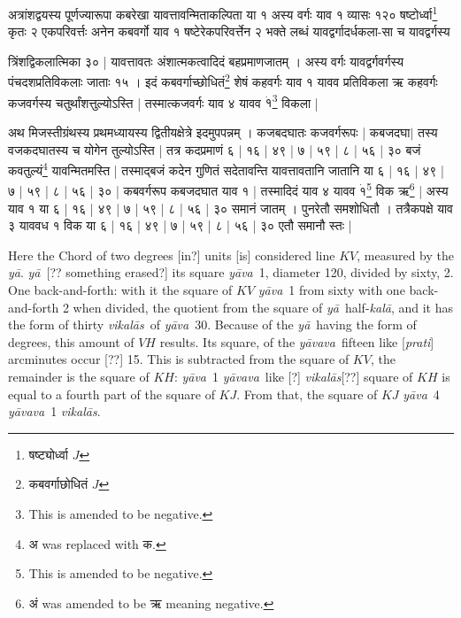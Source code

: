 \documentclass[12pt]{book}
\def\kala{\textit{ka\-l\=a}}
\def\ya{\textit{y\=a}}
\def\yava{\textit{y\=ava}}
\def\yavava{\textit{y\=avava}}
\def\vikalas{\textit{vi\-ka\-l\=as}}
\begin{document}
\newpage

{\s अत्रांशद्वयस्य पूर्णज्यारूपा कबरेखा
यावत्तावन्मिताकल्पिता या १ अस्य वर्गः
याव १ व्यासः १२० षष्टोर्ध्वा\footnote{{\s षष्ट्योर्ध्वा} $J$} कृतः २ एकपरिवर्त्तः अनेन कबवर्गो याव १ षष्टेरेकपरिवर्त्तेन २ भक्ते लब्धं
यावद्वर्गादर्धकला-सा च यावद्वर्गस्य 

त्रिंशद्विकलात्मिका ३० | 
यावत्तावतः अंशात्मकत्वादिदं बहप्रमाणजातम् । अस्य वर्गः यावद्वर्गवर्गस्य
पंचदशप्रतिविकलाः जाताः १५ । इदं कबवर्गाच्छोधितं\footnote{{\s कबवर्गाछोधितं} $J$} शेषं कहवर्गः याव १ यावव प्रतिविकला ऋ कहवर्गः कजवर्गस्य चतुर्थांशत्तुल्योऽस्ति |  तस्मात्कजवर्गः याव ४ यावव $\dot{१}$\footnote{This is amended to be negative.}
विकला |

अथ मिजस्तीग्रंथस्य प्रथमध्यायस्य द्वितीयक्षेत्रे इदमुपपन्नम् । कजबदघातः कजवर्गरूपः |
कबजदघा$|$
तस्य वजकदघातस्य च योगेन तुल्योऽस्ति | तत्र कदप्रमाणं ६ | १६ | ४९ | ७ | ५९ | ८ | ५६ | ३० बजं कवतुल्यं\footnote{{\s अ} was replaced with {\s क}.}
यावन्मितमस्ति | तस्माद्बजं कदेन गुणितं सदेतावन्ति यावत्तावतानि जातानि या ६ | १६ | ४९ | ७ | ५९ | ८ | ५६ | ३० | कबवर्गरूप कबजदघात याव १ |
तस्मादिदं याव ४ यावव $\dot{१}$\footnote{This is amended to be negative.} विक ऋ\footnote{{\s अं} was amended to be {\s ऋ} meaning negative.} | अस्य याव १ या ६ | १६ | ४९ | ७ | ५९ | ८ | ५६ | ३० समानं जातम् । पुनरेतौ समशोधितौ । तत्रैकपक्षे
याव ३ याववध १ विक 
या ६ | १६ | ४९ | ७ | ५९ | ८ | ५६ | ३० एतौ समानौ स्तः |} 

\newpage

Here the Chord of two degrees [in?] units [is] considered line $KV$, measured by the \ya. 
\ya\ [?? something erased?] its square \yava\ 1, diameter 120, divided by sixty, 2. 
One back-and-forth: with it the square of $KV$ \yava\ 1 from sixty with one back-and-forth 2
when divided, the quotient from the square of \ya\ half-\kala, and it has the form of thirty \vikalas\
of \yava\ 30. Because of the \ya\ having the form of degrees, this amount of 
$VH$ results. Its square,  of the \yavava\ fifteen like [\textit{prati}] arcminutes occur [??] 15. 
This is subtracted from the square of $KV$, the remainder is the square of $KH$: 
\yava\ 1 \yavava\ like [?] \vikalas [??] square of $KH$ is equal to a fourth part of the
square of $KJ$. From that, the square of $KJ$ \yava\ 4 \yavava\ 1 \vikalas.
\end{document}

